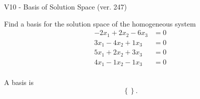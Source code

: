 \begin{exercise}
  \begin{exerciseTitle}V10 - Basis of Solution Space (ver. 247)\end{exerciseTitle}
  \begin{exerciseStatement}
    Find a basis for the solution space of the homogeneous system 
\begin{align*}
 -2 x_ 1 + 2 x_ 2 -6 x_ 3 &= 0  \\ 
  3 x_ 1 -4 x_ 2 + 1 x_ 3 &= 0  \\ 
  5 x_ 1 + 2 x_ 2 + 3 x_ 3 &= 0  \\ 
  4 x_ 1 -1 x_ 2 -1 x_ 3 &= 0  \\ 
 \end{align*}


 
  \end{exerciseStatement}

  \begin{exerciseAnswer}
   A basis is   
\[\left\{\right\}.\]

  


  \end{exerciseAnswer}
\end{exercise}